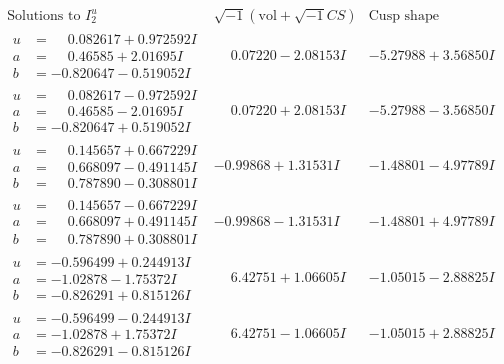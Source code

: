 \documentclass[1p]{elsarticle_modified}
\theoremstyle{definition}
\newcommand{\I}{\sqrt{-1}}
\begin{document}
$$\begin{array}{c|c|c}  
\text{Solutions to }I^u_{2}& \I (\text{vol} + \sqrt{-1}CS) & \text{Cusp shape}\\
 \hline 
\begin{aligned}
u &= \phantom{-}0.082617 + 0.972592 I \\
a &= \phantom{-}0.46585 + 2.01695 I \\
b &= -0.820647 - 0.519052 I\end{aligned}
 & \phantom{-}0.07220 - 2.08153 I & -5.27988 + 3.56850 I \\ \hline\begin{aligned}
u &= \phantom{-}0.082617 - 0.972592 I \\
a &= \phantom{-}0.46585 - 2.01695 I \\
b &= -0.820647 + 0.519052 I\end{aligned}
 & \phantom{-}0.07220 + 2.08153 I & -5.27988 - 3.56850 I \\ \hline\begin{aligned}
u &= \phantom{-}0.145657 + 0.667229 I \\
a &= \phantom{-}0.668097 - 0.491145 I \\
b &= \phantom{-}0.787890 - 0.308801 I\end{aligned}
 & -0.99868 + 1.31531 I & -1.48801 - 4.97789 I \\ \hline\begin{aligned}
u &= \phantom{-}0.145657 - 0.667229 I \\
a &= \phantom{-}0.668097 + 0.491145 I \\
b &= \phantom{-}0.787890 + 0.308801 I\end{aligned}
 & -0.99868 - 1.31531 I & -1.48801 + 4.97789 I \\ \hline\begin{aligned}
u &= -0.596499 + 0.244913 I \\
a &= -1.02878 - 1.75372 I \\
b &= -0.826291 + 0.815126 I\end{aligned}
 & \phantom{-}6.42751 + 1.06605 I & -1.05015 - 2.88825 I \\ \hline\begin{aligned}
u &= -0.596499 - 0.244913 I \\
a &= -1.02878 + 1.75372 I \\
b &= -0.826291 - 0.815126 I\end{aligned}
 & \phantom{-}6.42751 - 1.06605 I & -1.05015 + 2.88825 I \\ \hline\begin{aligned}

\end{aligned}
\end{array}$$
\end{document}
